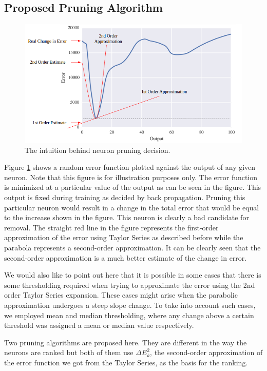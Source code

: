 \subsection{Proposed Pruning Algorithm}
\begin{figure}
  \includegraphics[width=\linewidth]{png/intuition.png}
  \caption{The intuition behind neuron pruning decision.}
  \label{fig:intuition}
\end{figure}

Figure \ref{fig:intuition} shows a random error function plotted against the output of any given neuron. Note that this figure is for illustration purposes only. The error function is minimized at a particular value of the output as can be seen in the figure. This output is fixed during training as decided by back propagation. Pruning this particular neuron would result in a change in the total error that would be equal to the increase shown in the figure. This neuron is clearly a bad candidate for removal. The straight red line in the figure represents the first-order approximation of the error using Taylor Series as described before while the parabola represents a second-order approximation. It can be clearly seen that the second-order approximation is a much better estimate of the change in error.

We would also like to point out here that it is possible in some cases that there is some thresholding required when trying to approximate the error using the 2nd order Taylor Series expansion. These cases might arise when the parabolic approximation undergoes a steep slope change. To take into account such cases, we employed mean and median thresholding, where any change above a certain threshold was assigned a mean or median value respectively.

Two pruning algorithms are proposed here. They are different in the way the neurons are ranked but both of them use $\Delta E_{k}^2$, the second-order approximation of the error function we got from the Taylor Series, as the basis for the ranking.

